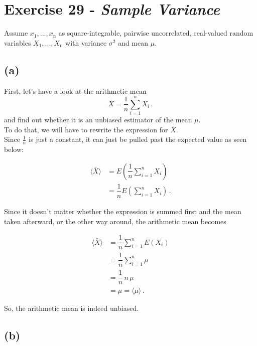 \section{Exercise 29 - \textit{Sample Variance}}
\label{sec:ex29}

Assume $x_1, ..., x_\text{n}$ as square-integrable, pairwise uncorrelated, real-valued random variables $X_1, ..., X_\text{n}$ with variance $\sigma^2$ and mean $\mu$.

\subsection*{(a)}

First, let's have a look at the arithmetic mean
\begin{equation*}
    \bar{X} = \dfrac{1}{n} \sum_{i=1}^n X_i \,.
\end{equation*}
and find out whether it is an unbiased estimator of the mean $\mu$. \\

To do that, we will have to rewrite the expression for $\bar{X}$. \\
Since $\frac{1}{n}$ is just a constant, it can just be pulled past the expected value as seen below:

\begin{align*}
    \langle \bar{X} \rangle &=  E \left(\dfrac{1}{n} \sum_{i=1}^n X_i \right) \\
                            &= \dfrac{1}{n} E \left(\sum_{i=1}^n X_i \right) \,.
\end{align*}

Since it doesn't matter whether the expression is summed first and the mean taken afterward, or the other way around, the arithmetic mean becomes

\begin{align*}
    \langle \bar{X} \rangle &= \dfrac{1}{n} \sum_{i=1}^n E(X_i) \\
                            &= \dfrac{1}{n} \sum_{i=1}^n \mu  \\
                            &= \dfrac{1}{n} \, n \, \mu \\
                            &= \mu = \langle \mu \rangle \,.
\end{align*}

So, the arithmetic mean is indeed unbiased.

\subsection*{(b)}

